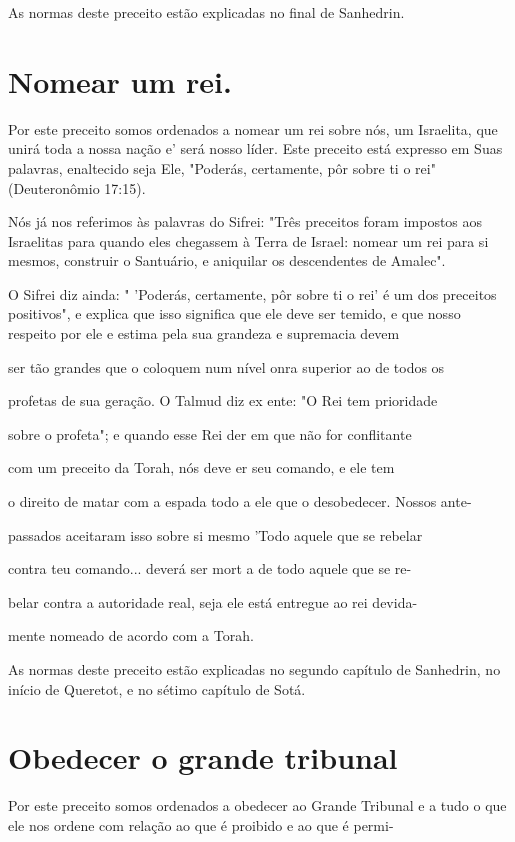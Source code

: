 As normas deste preceito estão explicadas no final de Sanhedrin.



\section{Nomear um rei.}

Por este preceito somos ordenados a nomear um rei sobre nós, um
Israelita, que unirá toda a nossa nação e' será nosso líder. Este
preceito está ex­presso em Suas palavras, enaltecido seja Ele, "Poderás,
certamente, pôr sobre ti o rei" (Deuteronômio 17:15).

Nós já nos referimos às palavras do Sifrei: "Três preceitos foram
im­postos aos Israelitas para quando eles chegassem à Terra de Israel:
nomear um rei para si mesmos, construir o Santuário, e aniquilar os
descendentes de Amalec".

O Sifrei diz ainda: " 'Poderás, certamente, pôr sobre ti o rei' é um dos
preceitos positivos", e explica que isso significa que ele deve ser
temido, e que nosso respeito por ele e estima pela sua grandeza e
supremacia devem

ser tão grandes que o coloquem num nível onra superior ao de todos os

profetas de sua geração. O Talmud diz ex ente: "O Rei tem prioridade

sobre o profeta"; e quando esse Rei der em que não for conflitante

com um preceito da Torah, nós deve er seu comando, e ele tem

o direito de matar com a espada todo a ele que o desobedecer. Nossos
ante-

passados aceitaram isso sobre si mesmo 'Todo aquele que se rebelar

contra teu comando... deverá ser mort a de todo aquele que se re-

belar contra a autoridade real, seja ele está entregue ao rei devida-

mente nomeado de acordo com a Torah.

As normas deste preceito estão explicadas no segundo capítulo de
Sanhedrin, no início de Queretot, e no sétimo capítulo de Sotá.

\section{Obedecer o grande tribunal}

Por este preceito somos ordenados a obedecer ao Grande Tribunal e a tudo
o que ele nos ordene com relação ao que é proibido e ao que é permi-



